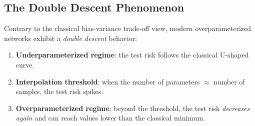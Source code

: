 \subsection{The Double Descent Phenomenon}

Contrary to the classical bias-variance trade-off view, modern
overparameterized networks exhibit a \emph{double descent} behavior:

\begin{enumerate}
    \item \textbf{Underparameterized regime}: the test risk follows the
          classical U-shaped curve.
    \item \textbf{Interpolation threshold}: when the number of parameters
          $\approx$ number of samples, the test risk spikes.
    \item \textbf{Overparameterized regime}: beyond the threshold, the test
          risk \emph{decreases again} and can reach values lower
          than the classical minimum.
\end{enumerate}

